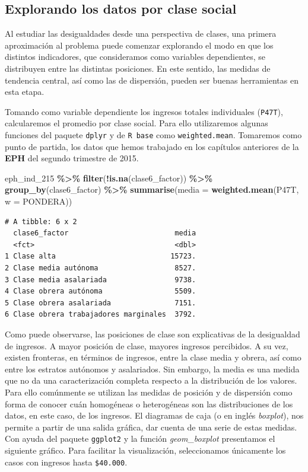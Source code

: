 \documentclass[
]{article}
\newenvironment{Shaded}{\begin{snugshade}}{\end{snugshade}}
\newcommand{\AttributeTok}[1]{\textcolor[rgb]{0.13,0.29,0.53}{#1}}
\newcommand{\FunctionTok}[1]{\textcolor[rgb]{0.13,0.29,0.53}{\textbf{#1}}}
\newcommand{\NormalTok}[1]{#1}
\newcommand{\SpecialCharTok}[1]{\textcolor[rgb]{0.81,0.36,0.00}{\textbf{#1}}}
\begin{document}
\hypertarget{explorando}{%
\subsection{Explorando los datos por clase social}\label{explorando}}

Al estudiar las desigualdades desde una perspectiva de clases, una primera aproximación al problema puede comenzar explorando el modo en que los distintos indicadores, que consideramos como variables dependientes, se distribuyen entre las distintas posiciones. En este sentido, las medidas de tendencia central, así como las de dispersión, pueden ser buenas herramientas en esta etapa.

Tomando como variable dependiente los ingresos totales individuales (\texttt{P47T}), calcularemos el promedio por clase social. Para ello utilizaremos algunas funciones del paquete \texttt{dplyr} y de \texttt{R\ base} como \texttt{weighted.mean}. Tomaremos como punto de partida, los datos que hemos trabajado en los capítulos anteriores de la \textbf{EPH} del segundo trimestre de 2015.

\begin{Shaded}
\begin{Highlighting}[]
\NormalTok{eph\_ind\_215 }\SpecialCharTok{\%\textgreater{}\%}
    \FunctionTok{filter}\NormalTok{(}\SpecialCharTok{!}\FunctionTok{is.na}\NormalTok{(clase6\_factor)) }\SpecialCharTok{\%\textgreater{}\%}
    \FunctionTok{group\_by}\NormalTok{(clase6\_factor) }\SpecialCharTok{\%\textgreater{}\%}
    \FunctionTok{summarise}\NormalTok{(}\AttributeTok{media =} \FunctionTok{weighted.mean}\NormalTok{(P47T, }\AttributeTok{w =}\NormalTok{ PONDERA))}
\end{Highlighting}
\end{Shaded}

\begin{verbatim}
# A tibble: 6 x 2
  clase6_factor                         media
  <fct>                                 <dbl>
1 Clase alta                           15723.
2 Clase media autónoma                  8527.
3 Clase media asalariada                9738.
4 Clase obrera autónoma                 5509.
5 Clase obrera asalariada               7151.
6 Clase obrera trabajadores marginales  3792.
\end{verbatim}

Como puede observarse, las posiciones de clase son explicativas de la desigualdad de ingresos. A mayor posición de clase, mayores ingresos percibidos. A su vez, existen fronteras, en términos de ingresos, entre la clase media y obrera, así como entre los estratos autónomos y asalariados. Sin embargo, la media es una medida que no da una caracterización completa respecto a la distribución de los valores. Para ello comúnmente se utilizan las medidas de posición y de dispersión como forma de conocer cuán homogéneas o heterogéneas son las distribuciones de los datos, en este caso, de los ingresos. El diagramas de caja (o en inglés \emph{boxplot}), nos permite a partir de una salida gráfica, dar cuenta de una serie de estas medidas. Con ayuda del paquete \texttt{ggplot2} y la función \emph{geom\_boxplot} presentamos el siguiente gráfico. Para facilitar la visualización, seleccionamos únicamente los casos con ingresos hasta \texttt{\$40.000}.
\end{document}

